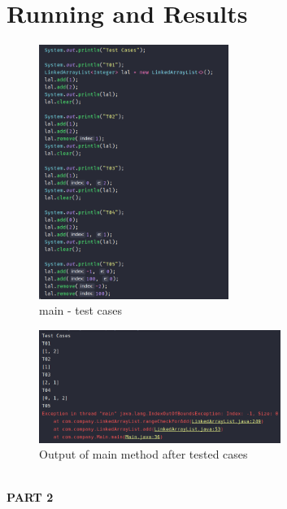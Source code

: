 \documentclass[a4paper]{article}
\begin{document}
\begin{large}
\begin{center}
\begin{table}[htp]
\end{table}

\end{center}

\newpage

\section{Running and Results}

\begin{figure}[htp]
  \centering
  \caption{main - test cases}
  \includegraphics[width=0.55\textwidth]{main-test}
\end{figure}

\begin{figure}[htp]
  \centering
  \caption{Output of main method after tested cases}
  \includegraphics[width=0.7\textwidth]{main-out}
\end{figure}

\newpage

\begin{center}
  \textbf{ \\
  \vspace{3cm}
  \Huge{PART 2}
  }
\end{center}


\end{large}
\end{document}
